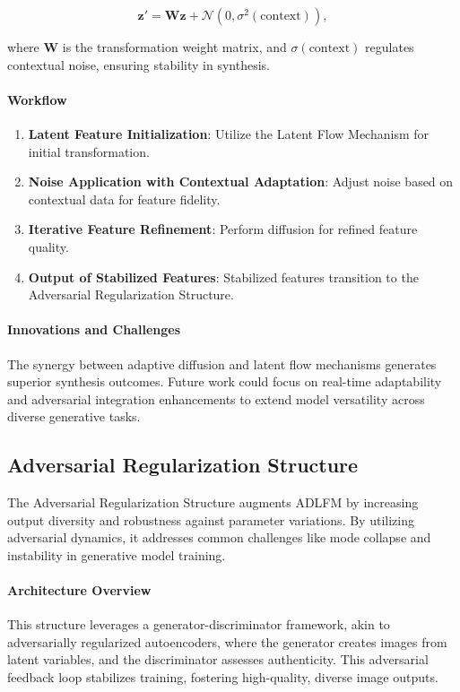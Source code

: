 \[
\mathbf{z}' = \mathbf{W} \mathbf{z} + \mathcal{N}(0, \sigma^2(\text{context})),
\]

where \( \mathbf{W} \) is the transformation weight matrix, and \( \sigma(\text{context}) \) regulates contextual noise, ensuring stability in synthesis.

\paragraph{Workflow}
\begin{enumerate}
    \item \textbf{Latent Feature Initialization}: Utilize the Latent Flow Mechanism for initial transformation.
    \item \textbf{Noise Application with Contextual Adaptation}: Adjust noise based on contextual data for feature fidelity.
    \item \textbf{Iterative Feature Refinement}: Perform diffusion for refined feature quality.
    \item \textbf{Output of Stabilized Features}: Stabilized features transition to the Adversarial Regularization Structure.
\end{enumerate}

\paragraph{Innovations and Challenges}
The synergy between adaptive diffusion and latent flow mechanisms generates superior synthesis outcomes. Future work could focus on real-time adaptability and adversarial integration enhancements to extend model versatility across diverse generative tasks.

\subsection{Adversarial Regularization Structure}

The Adversarial Regularization Structure augments ADLFM by increasing output diversity and robustness against parameter variations. By utilizing adversarial dynamics, it addresses common challenges like mode collapse and instability in generative model training.

\paragraph{Architecture Overview}
This structure leverages a generator-discriminator framework, akin to adversarially regularized autoencoders, where the generator creates images from latent variables, and the discriminator assesses authenticity. This adversarial feedback loop stabilizes training, fostering high-quality, diverse image outputs.

